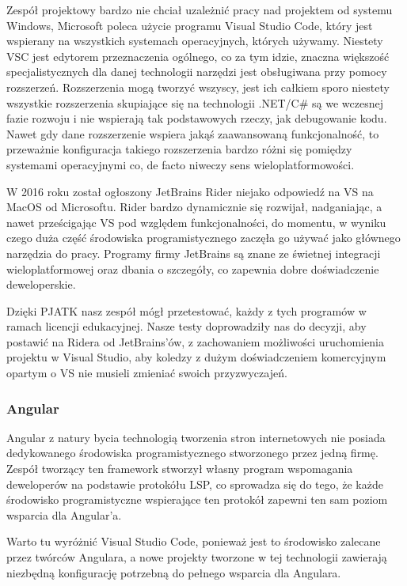 Zespół projektowy bardzo nie chciał uzależnić pracy nad projektem od systemu Windows, Microsoft poleca użycie programu Visual Studio Code, który jest wspierany na wszystkich systemach operacyjnych, których używamy.
Niestety VSC jest edytorem przeznaczenia ogólnego, co za tym idzie, znaczna większość specjalistycznych dla danej technologii narzędzi jest obsługiwana przy pomocy rozszerzeń.
Rozszerzenia mogą tworzyć wszyscy, jest ich całkiem sporo niestety wszystkie rozszerzenia skupiające się na technologii .NET/C\# są we wczesnej fazie rozwoju i nie wspierają tak podstawowych rzeczy, jak debugowanie kodu.
Nawet gdy dane rozszerzenie wspiera jakąś zaawansowaną funkcjonalność, to przeważnie konfiguracja takiego rozszerzenia bardzo różni się pomiędzy systemami operacyjnymi co, de facto niweczy sens wieloplatformowości.

W 2016 roku został ogłoszony JetBrains Rider niejako odpowiedź na VS na MacOS od Microsoftu.
Rider bardzo dynamicznie się rozwijał, nadganiając, a nawet prześcigając VS pod względem funkcjonalności, do momentu, w wyniku czego duża część środowiska programistycznego zaczęła go używać jako głównego narzędzia do pracy.
Programy firmy JetBrains są znane ze świetnej integracji wieloplatformowej oraz dbania o szczegóły, co zapewnia dobre doświadczenie deweloperskie.

Dzięki PJATK nasz zespół mógł przetestować, każdy z tych programów w ramach licencji edukacyjnej.
Nasze testy doprowadziły nas do decyzji, aby postawić na Ridera od JetBrains'ów, z zachowaniem możliwości uruchomienia projektu w Visual Studio, aby koledzy z dużym doświadczeniem komercyjnym opartym o VS nie musieli zmieniać swoich przyzwyczajeń.

\subsubsection{Angular}
Angular z natury bycia technologią tworzenia stron internetowych nie posiada dedykowanego środowiska programistycznego stworzonego przez jedną firmę.
Zespół tworzący ten framework stworzył własny program wspomagania deweloperów na podstawie protokółu LSP, co sprowadza się do tego, że każde środowisko programistyczne wspierające ten protokół zapewni ten sam poziom wsparcia dla Angular'a.

Warto tu wyróżnić Visual Studio Code, ponieważ jest to środowisko zalecane przez twórców Angulara, a nowe projekty tworzone w tej technologii zawierają niezbędną konfigurację potrzebną do pełnego wsparcia dla Angulara.

